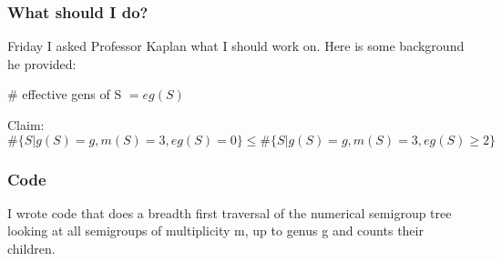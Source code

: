 \subsubsection*{What should I do?}

Friday I asked Professor Kaplan what I should work on. Here is some background he provided: 

\# effective gens of S $= eg(S)$


Claim: $\# \{ S | g(S) = g, m(S) = 3, eg(S) = 0\} \leq \# \{ S | g(S) = g, m(S) = 3, eg(S) \geq 2\}$

\subsubsection*{Code}
I wrote code that does a breadth first traversal of the numerical semigroup tree looking at all semigroups of multiplicity m, up to genus g and counts their children. 

